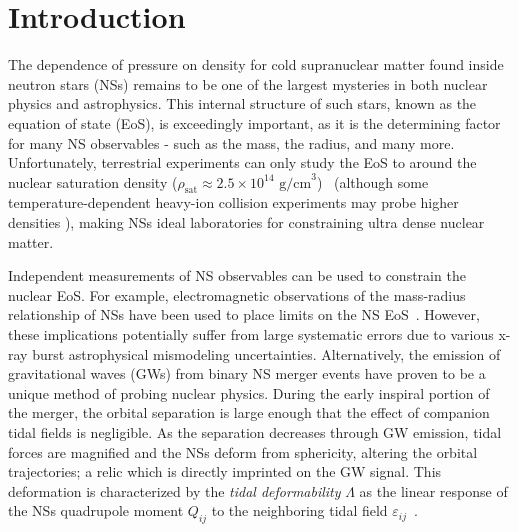 \documentclass[prd,twocolumn,nofootinbib,superscriptaddress,amsmath,amssymb]{revtex4-1}
\begin{document}
\maketitle


\section{Introduction}\label{sec:intro}
The dependence of pressure on density for cold supranuclear matter found inside neutron stars (NSs) remains to be one of the largest mysteries in both nuclear physics and astrophysics.
This internal structure of such stars, known as the equation of state (EoS), is exceedingly important, as it is the determining factor for many NS observables - such as the mass, the radius, and many more.
Unfortunately, terrestrial experiments can only study the EoS to around the nuclear saturation density ($\rho_{\text{sat}} \approx 2.5 \times 10^{14} \text{ g/cm}^3$)~\cite{Li:HeavyIon,Tsang:SymmetryEnergy,Centelles:NeutronSkin,Li:CrossSections,Chen:SymEnergy} (although some temperature-dependent heavy-ion collision experiments may probe higher densities  {}), making NSs ideal laboratories for constraining ultra dense nuclear matter.

Independent measurements of NS observables can be used to constrain the nuclear EoS.
For example, electromagnetic observations of the mass-radius relationship of NSs have been used to place limits on the NS EoS~\cite{guver,ozel-baym-guver,steiner-lattimer-brown,Lattimer2014,Ozel:2016oaf}.
However, these implications potentially suffer from large systematic errors due to various x-ray burst astrophysical mismodeling uncertainties.
Alternatively, the emission of gravitational waves (GWs) from binary NS merger events have proven to be a unique method of probing nuclear physics.
During the early inspiral portion of the merger, the orbital separation is large enough that the effect of companion tidal fields is negligible. 
As the separation decreases through GW emission, tidal forces are magnified and the NSs deform from sphericity, altering the orbital trajectories; a relic which is directly imprinted on the GW signal.
This deformation is characterized by the \textit{tidal deformability} $\Lambda$ as the linear response of the NSs quadrupole moment $Q_{ij}$ to the neighboring tidal field $\varepsilon_{ij}$~\cite{hinderer-love,Flanagan2008}.
\end{document}

